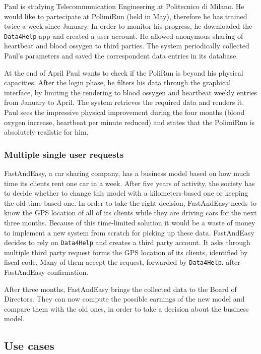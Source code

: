       Paul is studying Telecommunication Engineering at Politecnico di Milano. He would like to partecipate at PolimiRun (held in May), therefore he has trained twice a week since January. In order to monitor his progress, he downloaded the \texttt{Data4Help} app and created a user account. He allowed anonymous sharing of heartbeat and blood ossygen to third parties. The system periodically collected Paul's parameters and saved the correspondent data entries in its database.

      At the end of April Paul wants to check if the PoliRun is beyond his physical capacities. After the login phase, he filters his data through the graphical interface, by limiting the rendering to blood ossygen and heartbeat weekly entries from January to April. The system retrieves the required data and renders it. Paul sees the impressive physical improvement during the four months (blood oxygen increase, heartbeat per minute reduced) and states that the PolimiRun is absolutely realistic for him.

    \subsubsection{Multiple single user requests}

      FastAndEasy, a car sharing company, has a business model based on how much time its clients rent one car in a week. After five years of activity, the society has to decide whether to change this model with a kilometers-based one or keeping the old time-based one. In order to take the right decision, FastAndEasy needs to know the GPS location of all of its clients while they are driving cars for the next three months. Because of this time-limited solution it would be a waste of money to implement a new system from scratch for picking up these data. FastAndEasy decides to rely on \texttt{Data4Help} and creates a third party account. It asks through multiple third party request forms the GPS location of its clients, identified by fiscal code. Many of them accept the request, forwarded by \texttt{Data4Help}, after FastAndEasy confirmation.

      After three months, FastAndEasy brings the collected data to the Board of Directors. They can now compute the possible earnings of the new model and compare them with the old ones, in order to take a decision about the business model.

  \clearpage
  \subsection{Use cases}

